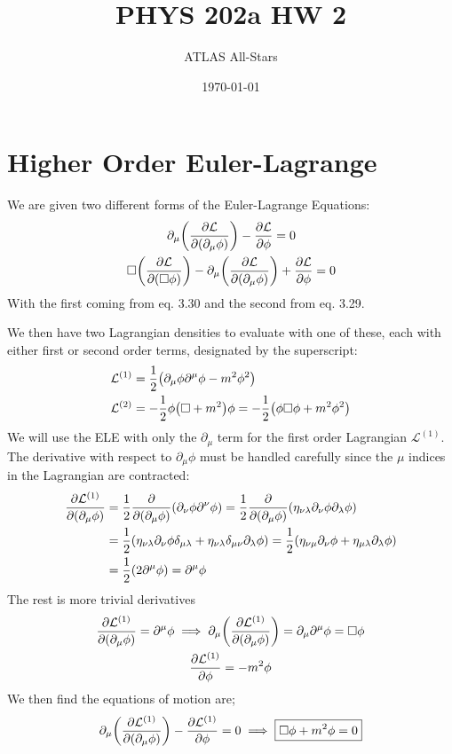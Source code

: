 \documentclass[12pt]{article}
\title{\vspace{-3em}PHYS 202a HW 2}
\author{ATLAS All-Stars}
\date{\today}
\renewcommand{\L}{\mathcal{L}}
\newcommand{\D}{\partial}
\begin{document}
\maketitle
\section{Higher Order Euler-Lagrange}
We are given two different forms of the Euler-Lagrange Equations:
\begin{gather*}
  \D_\mu\qty(\pdv{\L}{(\D_\mu\phi)})-\pdv{\L}{\phi}=0\\
  \Box\qty(\pdv{\L}{(\Box\phi)})
  -\D_\mu\qty(\pdv{\L}{(\D_\mu\phi)})+\pdv{\L}{\phi}=0
\end{gather*}
With the first coming from eq. 3.30 and the second from eq. 3.29.

We then have two Lagrangian densities to evaluate with one of these, each with either first or second order terms, designated by the superscript:
\begin{align*}
  \L^{(1)}&=\frac12\qty(\D_\mu\phi\D^\mu\phi-m^2\phi^2)\\
  \L^{(2)}&=-\frac12\phi\qty(\Box+m^2)\phi=-\frac12\qty(\phi\Box\phi+m^2\phi^2)
\end{align*}
We will use the ELE with only the $\D_\mu$ term for the first order Lagrangian $\L^{(1)}$. The derivative with respect to $\D_\mu\phi$ must be handled carefully since the $\mu$ indices in the Lagrangian are contracted:
\begin{align*}
  \pdv{\L^{(1)}}{(\D_\mu\phi)}&=
  \frac12\pdv{(\D_\mu\phi)}\qty(\D_\nu\phi\D^\nu\phi)
  =\frac12\pdv{(\D_\mu\phi)}\qty(\eta_{\nu\lambda}\D_\nu\phi\D_\lambda\phi)\\
  &=\frac12\qty(\eta_{\nu\lambda}\D_\nu\phi\delta_{\mu\lambda}
  +\eta_{\nu\lambda}\delta_{\mu\nu}\D_\lambda\phi)
  =\frac12\qty(\eta_{\nu\mu}\D_\nu\phi
  +\eta_{\mu\lambda}\D_\lambda\phi)\\
  &=\frac12\qty(2\D^\mu\phi)=\D^\mu\phi
\end{align*}
The rest is more trivial derivatives
\begin{gather*}
  \pdv{\L^{(1)}}{(\D_\mu\phi)}=\D^\mu\phi\implies
  \D_\mu\qty(\pdv{\L^{(1)}}{(\D_\mu\phi)})=\D_\mu\D^\mu\phi=\Box\phi\\
  \pdv{\L^{(1)}}{\phi}=-m^2\phi
\end{gather*}
We then find the equations of motion are;
\begin{align}
  \D_\mu\qty(\pdv{\L^{(1)}}{(\D_\mu\phi)})-\pdv{\L^{(1)}}{\phi}=0
  \implies\boxed{\Box\phi+m^2\phi=0}
\end{align}
\end{document}
